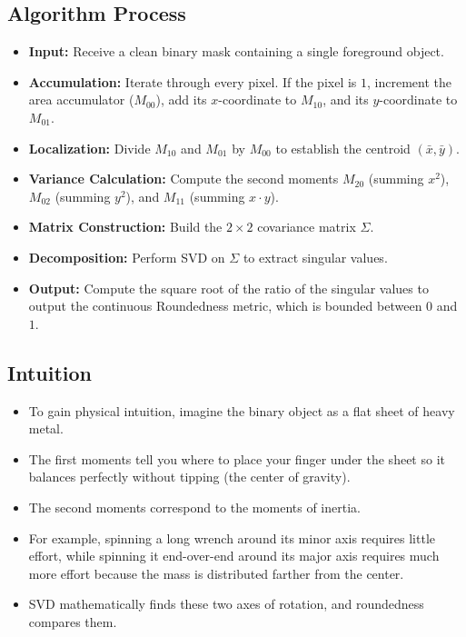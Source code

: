 \documentclass[12pt]{article}
\begin{document}
\subsection{Algorithm Process}
\begin{itemize}
    \item \textbf{Input:} Receive a clean binary mask containing a single foreground object.

    \item \textbf{Accumulation:} Iterate through every pixel. If the pixel is $1$, increment the area accumulator ($M_{00}$), add its $x$-coordinate to $M_{10}$, and its $y$-coordinate to $M_{01}$.

    \item \textbf{Localization:} Divide $M_{10}$ and $M_{01}$ by $M_{00}$ to establish the centroid $(\bar{x}, \bar{y})$.

    \item \textbf{Variance Calculation:} Compute the second moments $M_{20}$ (summing $x^2$), $M_{02}$ (summing $y^2$), and $M_{11}$ (summing $x \cdot y$).

    \item \textbf{Matrix Construction:} Build the $2 \times 2$ covariance matrix $\Sigma$.

    \item \textbf{Decomposition:} Perform SVD on $\Sigma$ to extract singular values.

    \item \textbf{Output:} Compute the square root of the ratio of the singular values to output the continuous Roundedness metric, which is bounded between $0$ and $1$.
\end{itemize}

\subsection{Intuition}
\begin{itemize}
    \item To gain physical intuition, imagine the binary object as a flat sheet of heavy metal.

    \item The first moments tell you where to place your finger under the sheet so it balances perfectly without tipping (the center of gravity).

    \item The second moments correspond to the moments of inertia.

    \item For example, spinning a long wrench around its minor axis requires little effort, while spinning it end-over-end around its major axis requires much more effort because the mass is distributed farther from the center.

    \item SVD mathematically finds these two axes of rotation, and roundedness compares them.
\end{itemize}
\end{document}
